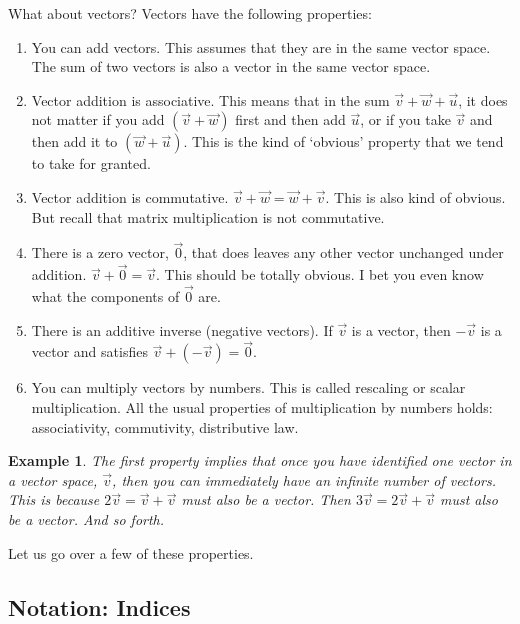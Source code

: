 \documentclass[12pt]{article}
\newtheorem{example}{Example}[section]
\begin{document}
What about vectors? Vectors have the following properties: 
\begin{enumerate}
    \item You can add vectors. This assumes that they are in the same vector space. The sum of two vectors is also a vector in the same vector space. 
    \item Vector addition is associative. This means that in the sum $\vec{v}+\vec{w}+\vec{u}$, it does not matter if you add $(\vec{v}+\vec{w})$ first and then add $\vec{u}$, or if you take $\vec{v}$ and then add it to $(\vec{w}+\vec{u})$. This is the kind of `obvious' property that we tend to take for granted.
    \item Vector addition is commutative. $\vec{v}+\vec{w} = \vec{w}+\vec{v}$. This is also kind of obvious. But recall that matrix multiplication is not commutative.
    \item There is a zero vector, $\vec{0}$, that does leaves any other vector unchanged under addition. $\vec{v}+\vec{0} = \vec{v}$. This should be totally obvious. I bet you even know what the components of $\vec{0}$ are.
    \item There is an additive inverse (negative vectors). If $\vec{v}$ is a vector, then $-\vec{v}$ is a vector and satisfies $\vec{v}+(-\vec{v}) = \vec{0}$.
    \item You can multiply vectors by numbers. This is called rescaling or scalar multiplication. All the usual properties of multiplication by numbers holds: associativity, commutivity, distributive law.
\end{enumerate}
\begin{example}
The first property implies that once you have identified one vector in a vector space, $\vec{v}$, then you can immediately have an infinite number of vectors. This is because $2\vec{v} = \vec{v}+\vec{v}$ must also be a vector. Then $3\vec{v} = 2\vec{v}+\vec{v}$ must also be a vector. And so forth.
\end{example}
Let us go over a few of these properties.

\subsection{Notation: Indices}
\end{document}
